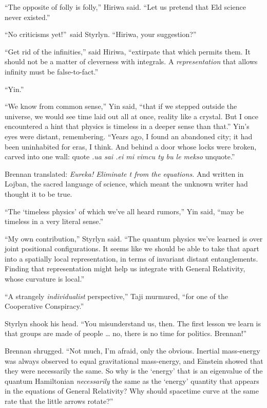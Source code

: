 {
 ``The opposite of folly is
folly,'' Hiriwa said. ``Let us
pretend that Eld science never existed.''}

{
 ``No criticisms yet!''~said
Styrlyn. ``Hiriwa, your
suggestion?''}

{
 ``Get rid of the infinities,''
said Hiriwa, ``extirpate that which permits them. It
should not be a matter of cleverness with integrals. A
\textit{representation} that allows infinity must be
false-to-fact.''}

{
 ``Yin.''}

{
 ``We know from common sense,''
Yin said, ``that if we stepped outside the universe,
we would see time laid out all at once, reality like a crystal. But I
once encountered a hint that physics is timeless in a deeper sense than
that.'' Yin's eyes were distant,
remembering. ``Years ago, I found an abandoned city;
it had been uninhabited for eras, I think. And behind a door whose
locks were broken, carved into one wall: quote \textit{.ua sai .ei mi
vimcu ty bu le mekso} unquote.''}

{
 Brennan translated: \textit{Eureka! Eliminate t from the
equations.} And written in Lojban, the sacred language of science,
which meant the unknown writer had thought it to be true.}

{
 ``The `timeless
physics' of which we've all heard
rumors,'' Yin said, ``may be
timeless in a very literal sense.''}

{
 ``My own contribution,''
Styrlyn said. ``The quantum physics
we've learned is over joint positional configurations.
It seems like we should be able to take that apart into a spatially
local representation, in terms of invariant distant entanglements.
Finding that representation might help us integrate with General
Relativity, whose curvature is local.''}

{
 ``A strangely \textit{individualist}
perspective,'' Taji murmured, ``for
one of the Cooperative Conspiracy.''}

{
 Styrlyn shook his head. ``You misunderstand us,
then. The first lesson we learn is that groups are made of people \ldots
no, there is no time for politics. Brennan!''}

{
 Brennan shrugged. ``Not much, I'm
afraid, only the obvious. Inertial mass-energy was always observed to
equal gravitational mass-energy, and Einstein showed that they were
necessarily the same. So why is the
`energy' that is an eigenvalue of the
quantum Hamiltonian \textit{necessarily} the same as the
`energy' quantity that appears in the
equations of General Relativity? Why should spacetime curve at the same
rate that the little arrows rotate?''}


